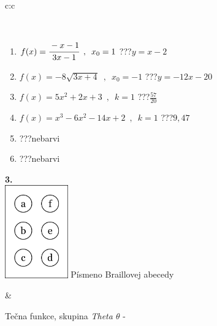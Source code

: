 \documentclass[10pt]{report}
\begin{document}
\begin{tabular}{c:c}
\begin{minipage}[c][104.5mm][t]{0.5\linewidth}
\begin{center}
\begin{minipage}{0.95\linewidth}
\begin{center}
\end{center}
\end{minipage}
\\[1mm]
\begin{minipage}{0.79\linewidth}
\begin{center}
\begin{varwidth}{\linewidth}
\begin{enumerate}
\small
\item $f(x)=\cfrac{-x-1}{3x-1}\enspace , \enspace x_0=1$\quad \dotfill\; ???\;\dotfill \quad $y = x-2$
\item $f(x)=-8\sqrt{3x+4}\enspace , \enspace x_0=-1$\quad \dotfill\; ???\;\dotfill \quad $y = -12x-20$
\item $f(x)=5x^2+2x+3\enspace , \enspace k=1$\quad \dotfill\; ???\;\dotfill \quad $\frac{57}{20}$
\item $f(x)=x^3-6x^2-14x+2\enspace , \enspace k=1$\quad \dotfill\; ???\;\dotfill \quad $9 , 47$
\item \quad \dotfill\; ???\;\dotfill \quad nebarvi
\item \quad \dotfill\; ???\;\dotfill \quad nebarvi
\end{enumerate}
\end{varwidth}
\end{center}
\end{minipage}
\begin{minipage}{0.20\linewidth}
\begin{center}
{\Huge\bfseries 3.} \\[2mm]
\includegraphics[height=40mm]{../images/braille.png}
{\small Písmeno Braillovej abecedy}
\end{center}
\end{minipage}
\end{center}
\end{minipage}
&
\begin{minipage}[c][104.5mm][t]{0.5\linewidth}
\begin{center}
\vspace{7mm}
{\huge Tečna funkce, skupina \textit{Theta $\theta$} -}\\[5mm]

\end{center}
\end{minipage}
\end{tabular}
\end{document}
